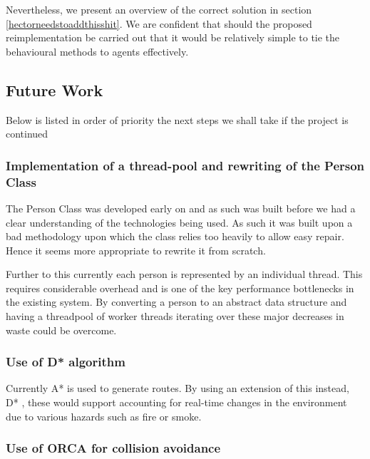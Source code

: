 Nevertheless, we present an overview of the correct solution in section \ref{hectorneedstoaddthisshit}. We are confident that should the proposed reimplementation be carried out that it would be relatively simple to tie the behavioural methods to agents effectively.










\subsection{Future Work}

Below is listed in order of priority the next steps we shall take
if the project is continued


\subsubsection{Implementation of a thread-pool and rewriting of the Person Class}

The Person Class was developed early on and as such was built before
we had a clear understanding of the technologies being used. As such
it was built upon a bad methodology upon which the class relies too
heavily to allow easy repair. Hence it seems more appropriate to rewrite
it from scratch.

Further to this currently each person is represented by an individual
thread. This requires considerable overhead and is one of the key
performance bottlenecks in the existing system. By converting a person
to an abstract data structure and having a threadpool of worker threads
iterating over these major decreases in waste could be overcome.


\subsubsection{Use of D{*} algorithm}

Currently A{*}\cite{Astar} is used to generate routes. By using an extension of this instead, D{*} \cite{Dstar}, these would support accounting for real-time changes in the environment due to various hazards such as fire or smoke.


\subsubsection{Use of ORCA for collision avoidance}

